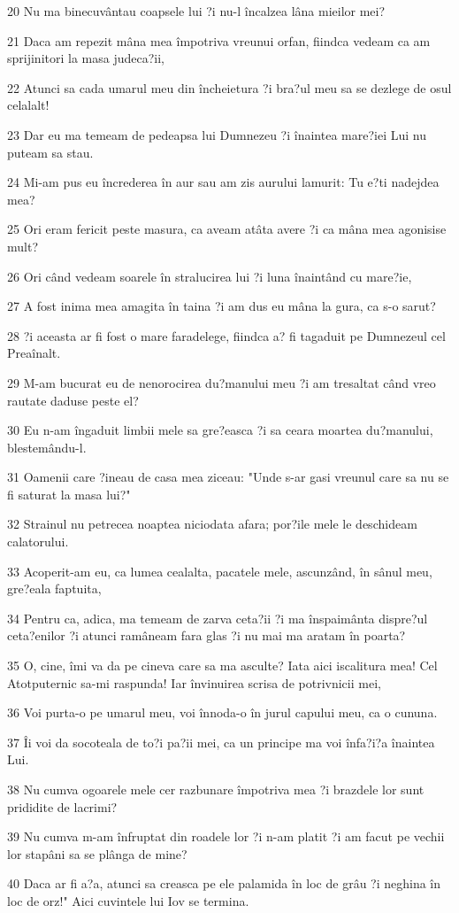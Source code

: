 \par 20 Nu ma binecuvântau coapsele lui ?i nu-l încalzea lâna mieilor mei?
\par 21 Daca am repezit mâna mea împotriva vreunui orfan, fiindca vedeam ca am sprijinitori la masa judeca?ii,
\par 22 Atunci sa cada umarul meu din încheietura ?i bra?ul meu sa se dezlege de osul celalalt!
\par 23 Dar eu ma temeam de pedeapsa lui Dumnezeu ?i înaintea mare?iei Lui nu puteam sa stau.
\par 24 Mi-am pus eu încrederea în aur sau am zis aurului lamurit: Tu e?ti nadejdea mea?
\par 25 Ori eram fericit peste masura, ca aveam atâta avere ?i ca mâna mea agonisise mult?
\par 26 Ori când vedeam soarele în stralucirea lui ?i luna înaintând cu mare?ie,
\par 27 A fost inima mea amagita în taina ?i am dus eu mâna la gura, ca s-o sarut?
\par 28 ?i aceasta ar fi fost o mare faradelege, fiindca a? fi tagaduit pe Dumnezeul cel Preaînalt.
\par 29 M-am bucurat eu de nenorocirea du?manului meu ?i am tresaltat când vreo rautate daduse peste el?
\par 30 Eu n-am îngaduit limbii mele sa gre?easca ?i sa ceara moartea du?manului, blestemându-l.
\par 31 Oamenii care ?ineau de casa mea ziceau: "Unde s-ar gasi vreunul care sa nu se fi saturat la masa lui?"
\par 32 Strainul nu petrecea noaptea niciodata afara; por?ile mele le deschideam calatorului.
\par 33 Acoperit-am eu, ca lumea cealalta, pacatele mele, ascunzând, în sânul meu, gre?eala faptuita,
\par 34 Pentru ca, adica, ma temeam de zarva ceta?ii ?i ma înspaimânta dispre?ul ceta?enilor ?i atunci ramâneam fara glas ?i nu mai ma aratam în poarta?
\par 35 O, cine, îmi va da pe cineva care sa ma asculte? Iata aici iscalitura mea! Cel Atotputernic sa-mi raspunda! Iar învinuirea scrisa de potrivnicii mei,
\par 36 Voi purta-o pe umarul meu, voi înnoda-o în jurul capului meu, ca o cununa.
\par 37 Îi voi da socoteala de to?i pa?ii mei, ca un principe ma voi înfa?i?a înaintea Lui.
\par 38 Nu cumva ogoarele mele cer razbunare împotriva mea ?i brazdele lor sunt prididite de lacrimi?
\par 39 Nu cumva m-am înfruptat din roadele lor ?i n-am platit ?i am facut pe vechii lor stapâni sa se plânga de mine?
\par 40 Daca ar fi a?a, atunci sa creasca pe ele palamida în loc de grâu ?i neghina în loc de orz!" Aici cuvintele lui Iov se termina.

